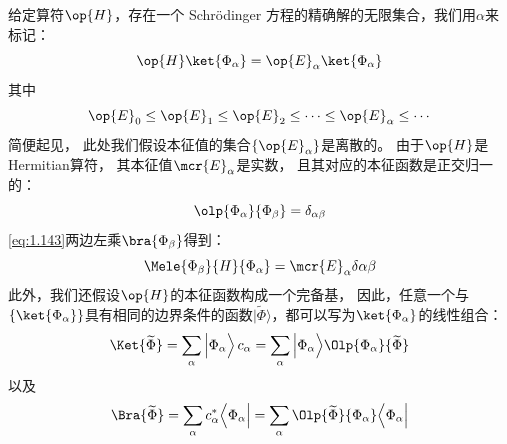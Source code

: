 给定算符$\op{H}$，存在一个 Schr\"odinger 方程的精确解的无限集合，我们用$\alpha$来标记：
\begin{equation}
 \op{H}\ket{\Phi_\alpha} = \op{E}_\alpha\ket{\Phi_\alpha}
 \label{eq:1.143}
\end{equation}
其中
\[
\op{E}_0 \leq \op{E}_1 \leq \op{E}_2 \leq \cdots \leq \op{E}_\alpha \leq \cdots
\]
简便起见，
此处我们假设本征值的集合$\left\{\op{E}_\alpha\right\}$是离散的。
由于$\op{H}$是 Hermitian算符，
其本征值$\mcr{E}_\alpha$是实数，
且其对应的本征函数是正交归一的：
\begin{equation}
 \olp{\Phi_\alpha}{\Phi_\beta} = \delta_{\alpha\beta}
 \label{eq:1.144}
\end{equation}
\autoref{eq:1.143}两边左乘$\bra{\Phi_\beta}$得到：
\begin{equation}
 \Mele{\Phi_\beta}{H}{\Phi_\alpha} = \mcr{E}_\alpha\delta{\alpha\beta}
 \label{eq:1.145}
\end{equation}
此外，我们还假设$\op{H}$的本征函数构成一个完备基，
因此，任意一个与$\left\{\ket{\Phi_\alpha}\right\}$具有相同的边界条件的函数$\vert\widetilde{\Phi}\rangle$，都可以写为$\ket{\Phi_\alpha}$的线性组合：
\begin{equation}
 \Ket{\widetilde{\Phi}} = \sum_\alpha \mathinner{\Big\vert\Phi_\alpha\Big\rangle} c_\alpha = \sum_\alpha \Big\vert\Phi_\alpha\Big\rangle \Olp{\Phi_\alpha}{\widetilde{\Phi}}
 \label{eq:1.146}
\end{equation}
以及
\begin{equation}
 \Bra{\widetilde\Phi} = \sum_\alpha c_\alpha^\ast \Big\langle\Phi_\alpha\Big\vert = \sum_\alpha \Olp{\widetilde\Phi}{\Phi_\alpha}\Big\langle\Phi_\alpha\Big\vert
 \label{eq:1.147}
\end{equation}

